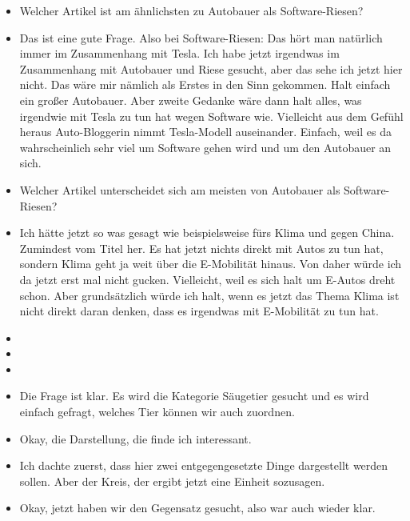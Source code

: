 {\begin{itemize}[]
            \item {} Welcher Artikel ist am ähnlichsten zu \flqq Autobauer als Software-Riesen\frqq{}?
            \item {} Das ist eine gute Frage.
                  Also bei Software-Riesen: Das hört man natürlich immer im Zusammenhang mit Tesla.
                  Ich habe jetzt irgendwas im Zusammenhang mit Autobauer und Riese gesucht, aber das sehe ich jetzt hier nicht.
                  Das wäre mir nämlich als Erstes in den Sinn gekommen.
                  Halt einfach ein großer Autobauer.
                  Aber zweite Gedanke wäre dann halt alles, was irgendwie mit Tesla zu tun hat wegen Software wie.
                  Vielleicht aus dem Gefühl heraus \flqq Auto-Bloggerin nimmt Tesla-Modell auseinander\frqq{}.
                  Einfach, weil es da wahrscheinlich sehr viel um Software gehen wird und um den Autobauer an sich.
            \item {} Welcher Artikel unterscheidet sich am meisten von \flqq Autobauer als Software-Riesen\frqq{}?
            \item {} Ich hätte jetzt so was gesagt wie beispielsweise \flqq fürs Klima und gegen China\frqq{}.
                  Zumindest vom Titel her.
                  Es hat jetzt nichts direkt mit Autos zu tun hat, sondern Klima geht ja weit über die E-Mobilität hinaus.
                  Von daher würde ich da jetzt erst mal nicht gucken.
                  Vielleicht, weil es sich halt um E-Autos dreht schon.
                  Aber grundsätzlich würde ich halt, wenn es jetzt das Thema Klima ist nicht direkt daran denken, dass es irgendwas mit E-Mobilität zu tun hat.
            \item {}
            \item {}
            \item {}
            \item {} Die Frage ist klar.
                  Es wird die Kategorie Säugetier gesucht und es wird einfach gefragt, welches Tier können wir auch zuordnen.
            \item {} Okay, die Darstellung, die finde ich interessant.
            \item {} Ich dachte zuerst, dass hier zwei entgegengesetzte Dinge dargestellt werden sollen. Aber der Kreis, der ergibt jetzt eine Einheit sozusagen.
            \item {} Okay, jetzt haben wir den Gegensatz gesucht, also war auch wieder klar.

\end{itemize}}
